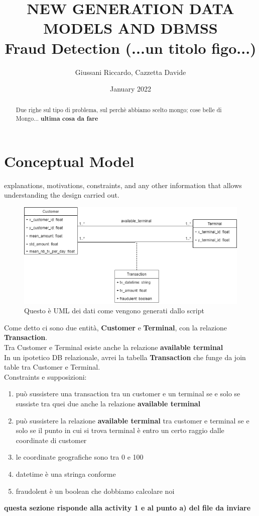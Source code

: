 \documentclass[letterpaper,11pt]{article}
\begin{document}
\title{NEW GENERATION DATA MODELS AND DBMSS \\\textbf{Fraud Detection (...un titolo figo...)}}
\author{Giussani Riccardo, Cazzetta Davide}
\date{January 2022}
\maketitle

\begin{abstract}
Due righe sul tipo di problema, sul perchè abbiamo scelto mongo; cose belle di Mongo... 
\textbf{ultima cosa da fare}
\end{abstract}

\section{Conceptual Model}

explanations, motivations, constraints, and any other information that allows understanding the design carried out.
\\
\begin{figure}[ht] 
        \centering \includegraphics[width=0.9\columnwidth]{FraudDetectionUML.png}
        \caption{\label{fig1}Questo è UML dei dati come vengono generati dallo script}
\end{figure}
Come detto ci sono due entità, \textbf{Customer} e \textbf{Terminal}, con la relazione \textbf{Transaction}.
\\
Tra Customer e Terminal esiste anche la relazione \textbf{available terminal}
\\
In un ipotetico DB relazionale, avrei la tabella \textbf{Transaction} che funge da join table tra Customer e Terminal.
\\
Constraints e supposizioni:
\begin{enumerate}
    \item può sussistere una transaction tra un customer e un terminal se e solo se sussiste tra quei due anche la relazione \textbf{available terminal}
    \item può sussistere la relazione \textbf{available terminal} tra customer e terminal se e solo se il punto in cui si trova terminal è entro un certo raggio dalle coordinate di customer
    \item le coordinate geografiche sono tra 0 e 100
    \item datetime è una stringa conforme
    \item fraudolent è un boolean che dobbiamo calcolare noi
\end{enumerate}
\textbf{questa sezione risponde alla activity 1 e al punto a) del file da inviare}
\end{document}
